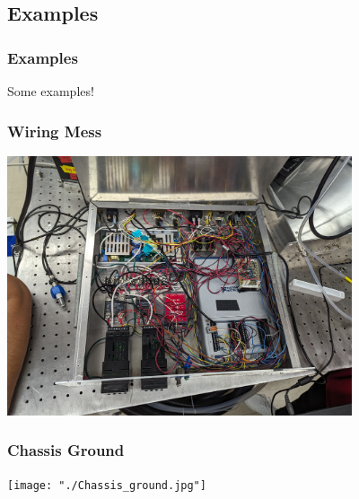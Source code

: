 \documentclass{presentation}
\begin{document}
\subsection{Examples}

\begin{frame}\frametitle{Examples}
  \huge
  Some examples!
\end{frame}

\begin{frame}\frametitle{Wiring Mess}
  \centering
  \includegraphics[width=4in]{"./wiring-mess.jpg"}
\end{frame}

\begin{frame}\frametitle{Chassis Ground}
  \centering
  \texttt{[image: "./Chassis\_ground.jpg"]}
\end{frame}
\end{document}
